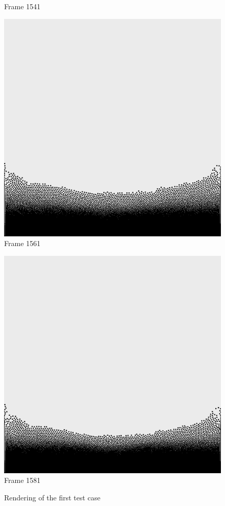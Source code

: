 \documentclass[a4paper, 12pt, oneside]{book}
\begin{document}
\begin{figure}[!ht]
\begin{center}
            Frame 1541
        \end{center}
    \endminipage
    \hfill
        \begin{center}
            \includegraphics[width=\linewidth]{images/test_case_1/1561.png}
            Frame 1561
        \end{center}
    \endminipage
    \hfill
        \begin{center}
            \includegraphics[width=\linewidth]{images/test_case_1/1581.png}
            Frame 1581
        \end{center}
    \endminipage
    \hfill

    \caption{Rendering of the first test case}
    \label{fig:test case 1}
\end{figure}
\end{document}

